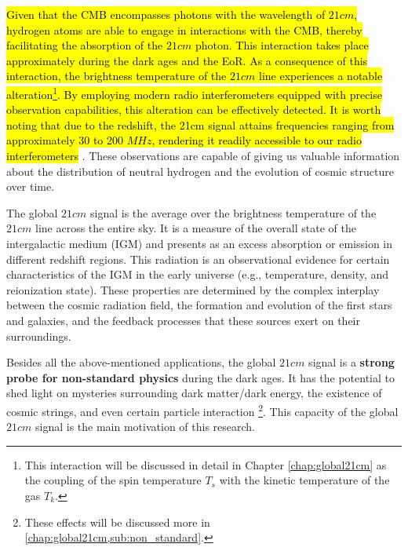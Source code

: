\documentclass[12pt, TexShade, letterpaper]{report}
\begin{document}
\hl{Given that the CMB encompasses photons with the wavelength of $21cm$, hydrogen atoms are able to engage in interactions with the CMB, thereby facilitating the absorption of the $21cm$ photon. This interaction takes place approximately during the dark ages and the EoR. As a consequence of this interaction, the brightness temperature of the $21cm$ line experiences a notable alteration\footnote{This interaction will be discussed in detail in Chapter \ref{chap:global21cm} as the coupling of the spin temperature $T_s$ with the kinetic temperature of the gas $T_k$.}. By employing modern radio interferometers equipped with precise observation capabilities, this alteration can be effectively detected. It is worth noting that due to the redshift, the 21cm signal attains frequencies ranging from approximately 30 to 200 $MHz$, rendering it readily accessible to our radio interferometers} \cite{low_frequency}.
These observations are capable of giving us valuable information about the distribution of neutral hydrogen and the evolution of cosmic structure over time\cite{low_frequency}.\par
The global $21cm$ signal is the average over the brightness temperature of the $21cm$ line across the entire sky. It is a measure of the overall state of the intergalactic medium (IGM) and presents as an excess absorption or emission in different redshift regions. This radiation is an observational evidence for certain characteristics of the IGM in the early universe (e.g., temperature, density, and reionization state). These properties are determined by the complex interplay between the cosmic radiation field, the formation and evolution of the first stars and galaxies, and the feedback processes that these sources exert on their surroundings\cite{21century}.\par
Besides all the above-mentioned applications, the global $21cm$ signal is a \textbf{strong probe for non-standard physics} during the dark ages. It has the potential to shed light on mysteries surrounding dark matter/dark energy, the existence of cosmic strings, and even certain particle interaction  \cite{dark_nature_21, constrain_dm_21, cosmic_string_brandenberger, ee_interaction_21, neutrino_21} \footnote{These effects will be discussed more in \ref{chap:global21cm,sub:non_standard}.}. This capacity of the global $21cm$ signal is the main motivation of this research.\par
\end{document}
